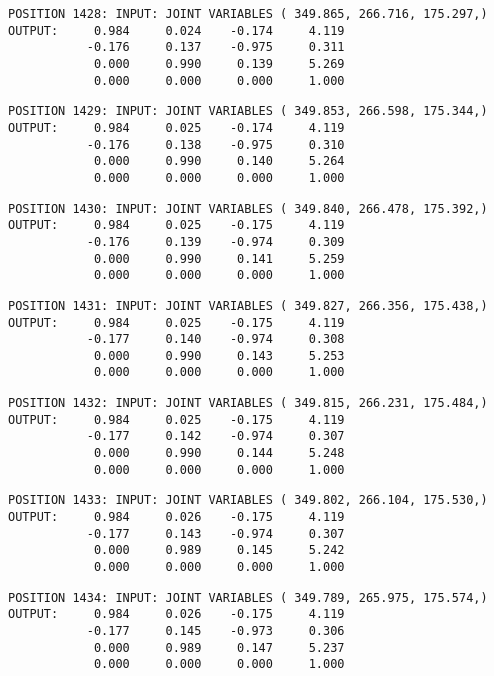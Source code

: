 \begin{verbatim}
POSITION 1428: INPUT: JOINT VARIABLES ( 349.865, 266.716, 175.297,)
OUTPUT:     0.984     0.024    -0.174     4.119
           -0.176     0.137    -0.975     0.311
            0.000     0.990     0.139     5.269
            0.000     0.000     0.000     1.000
\end{verbatim} \pagebreak[1]\begin{verbatim}
POSITION 1429: INPUT: JOINT VARIABLES ( 349.853, 266.598, 175.344,)
OUTPUT:     0.984     0.025    -0.174     4.119
           -0.176     0.138    -0.975     0.310
            0.000     0.990     0.140     5.264
            0.000     0.000     0.000     1.000
\end{verbatim} \pagebreak[1]\begin{verbatim}
POSITION 1430: INPUT: JOINT VARIABLES ( 349.840, 266.478, 175.392,)
OUTPUT:     0.984     0.025    -0.175     4.119
           -0.176     0.139    -0.974     0.309
            0.000     0.990     0.141     5.259
            0.000     0.000     0.000     1.000
\end{verbatim} \pagebreak[1]\begin{verbatim}
POSITION 1431: INPUT: JOINT VARIABLES ( 349.827, 266.356, 175.438,)
OUTPUT:     0.984     0.025    -0.175     4.119
           -0.177     0.140    -0.974     0.308
            0.000     0.990     0.143     5.253
            0.000     0.000     0.000     1.000
\end{verbatim} \pagebreak[1]\begin{verbatim}
POSITION 1432: INPUT: JOINT VARIABLES ( 349.815, 266.231, 175.484,)
OUTPUT:     0.984     0.025    -0.175     4.119
           -0.177     0.142    -0.974     0.307
            0.000     0.990     0.144     5.248
            0.000     0.000     0.000     1.000
\end{verbatim} \pagebreak[1]\begin{verbatim}
POSITION 1433: INPUT: JOINT VARIABLES ( 349.802, 266.104, 175.530,)
OUTPUT:     0.984     0.026    -0.175     4.119
           -0.177     0.143    -0.974     0.307
            0.000     0.989     0.145     5.242
            0.000     0.000     0.000     1.000
\end{verbatim} \pagebreak[1]\begin{verbatim}
POSITION 1434: INPUT: JOINT VARIABLES ( 349.789, 265.975, 175.574,)
OUTPUT:     0.984     0.026    -0.175     4.119
           -0.177     0.145    -0.973     0.306
            0.000     0.989     0.147     5.237
            0.000     0.000     0.000     1.000
\end{verbatim} \pagebreak[1]\begin{verbatim}

\end{verbatim}
